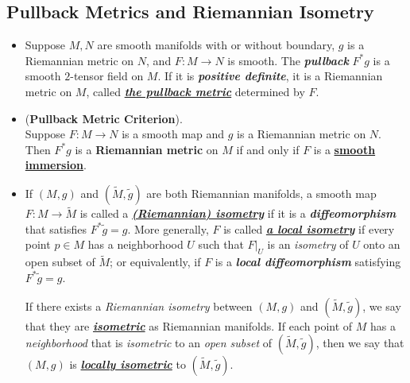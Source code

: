 \documentclass[11pt]{article}
\begin{document}
\subsection{Pullback Metrics and Riemannian Isometry}
\begin{itemize}
\item  \begin{definition}
Suppose $M, N$ are smooth manifolds with or without boundary, $g$ is a Riemannian metric on $N$, and $F: M \rightarrow N$ is smooth. The \emph{\textbf{pullback}} $F^{*}g$ is a smooth $2$-tensor field on $M$. If it is \emph{\textbf{positive definite}}, it is a Riemannian metric on $M$, called \underline{\emph{\textbf{the pullback metric}}} determined by $F$. 
\end{definition}

\item \begin{proposition} (\textbf{Pullback Metric Criterion}). \citep{lee2003introduction} \\
Suppose $F: M \rightarrow N$ is a smooth map and $g$ is a Riemannian metric on $N$. Then $F^{*}g$ is a \textbf{Riemannian metric} on $M$ if and only if $F$ is a \underline{\textbf{smooth immersion}}.
\end{proposition}

\item \begin{definition}
If $(M, g)$ and  $(\widetilde{M}, \widetilde{g})$ are both Riemannian manifolds, a smooth map  $F: M \rightarrow \widetilde{M}$ is called a \underline{\emph{\textbf{(Riemannian) isometry}}} if it is a \emph{\textbf{diffeomorphism}} that satisfies $F^{*}\widetilde{g} = g$. More generally, $F$ is called \underline{\emph{\textbf{a local isometry}}} if every point $p \in M$ has a neighborhood $U$ such that $F|_{U}$ is an \emph{isometry} of $U$ onto an open subset of $\widetilde{M}$; or equivalently, if $F$ is a \emph{\textbf{local diffeomorphism}} satisfying $F^{*}\widetilde{g} = g$.

If there exists a \emph{Riemannian isometry} between $(M, g)$ and  $(\widetilde{M}, \widetilde{g})$, we say that they are \underline{\emph{\textbf{isometric}}} as Riemannian manifolds. If each point of $M$ has a \emph{neighborhood} that is \emph{isometric} to an \emph{open subset} of $(\widetilde{M}, \widetilde{g})$, then we say that $(M, g)$ is \underline{\emph{\textbf{locally isometric}}} to $(\widetilde{M}, \widetilde{g})$.
\end{definition}


\end{itemize}
\end{document}

